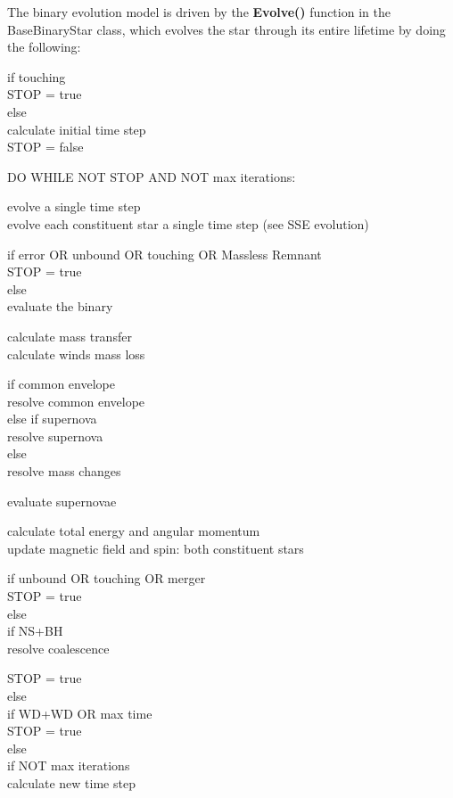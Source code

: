 The binary evolution model is driven by the \textbf{Evolve()} function in the BaseBinaryStar class, which evolves the star through its entire lifetime by doing the following:

\bigskip
if touching \\
\tabto{3em} STOP = true \\
else \\
\tabto{3em}calculate initial time step \\
\tabto{3em}STOP = false

\medskip
DO WHILE NOT STOP AND NOT max iterations:

\tabto{3em}evolve a single time step \\
\tabto{5em}evolve each constituent star a single time step (see SSE evolution)

\tabto{3em}if error OR unbound OR touching OR Massless Remnant \\
\tabto{5em}STOP = true \\
\tabto{3em}else \\
\tabto{5em}evaluate the binary

\tabto{7em}calculate mass transfer \\
\tabto{7em}calculate winds mass loss

\tabto{7em}if common envelope \\
\tabto{9em}resolve common envelope \\
\tabto{7em}else if supernova \\
\tabto{9em}resolve supernova \\
\tabto{7em}else \\
\tabto{9em}resolve mass changes

\tabto{7em}evaluate supernovae

\tabto{7em}calculate total energy and angular momentum \\
\tabto{7em}update magnetic field and spin: both constituent stars

\medskip
\tabto{5em}if unbound OR touching OR merger \\
\tabto{7em}STOP = true \\
\tabto{5em}else \\
\tabto{7em}if NS+BH \\
\tabto{9em}resolve coalescence

\tabto{9em}STOP = true \\
\tabto{7em}else \\
\tabto{9em}if WD+WD OR max time \\
\tabto{11em}STOP = true \\
\tabto{9em}else \\
\tabto{11em}if NOT max iterations \\
\tabto{13em}calculate new time step
